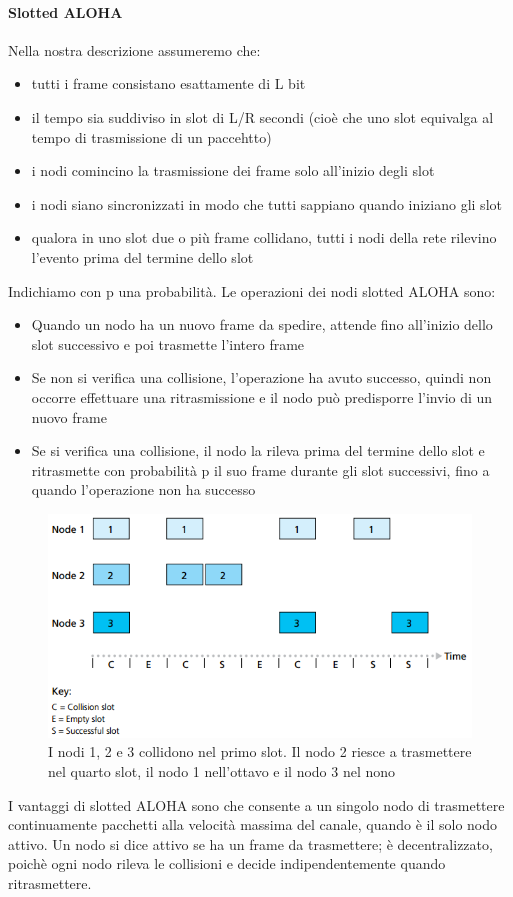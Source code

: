 \documentclass[11pt,a4paper]{article}
\begin{document}
\paragraph{Slotted ALOHA}
Nella nostra descrizione assumeremo che:
\begin{itemize}
	\item tutti i frame consistano esattamente di L bit
	\item il tempo sia suddiviso in slot di L/R secondi (cioè che uno slot equivalga al tempo di trasmissione di un paccehtto)
	\item i nodi comincino la trasmissione dei frame solo all'inizio degli slot
	\item i nodi siano sincronizzati in modo che tutti sappiano quando iniziano gli slot
	\item qualora in uno slot due o più frame collidano, tutti i nodi della rete rilevino l'evento prima del termine dello slot
\end{itemize}
Indichiamo con p una probabilità. Le operazioni dei nodi slotted ALOHA sono:
\begin{itemize}
	\item Quando un nodo ha un nuovo frame da spedire, attende fino all'inizio dello slot successivo e poi trasmette l'intero frame
	\item Se non si verifica una collisione, l'operazione ha avuto successo, quindi non occorre effettuare una ritrasmissione e il nodo può predisporre l'invio di un nuovo frame
	\item Se si verifica una collisione, il nodo la rileva prima del termine dello slot e ritrasmette con probabilità p il suo frame durante gli slot successivi, fino a quando l'operazione non ha successo
\end{itemize}
\begin{figure}
		\includegraphics[scale=0.6]{img/078.png}
		\caption{I nodi 1, 2 e 3 collidono nel primo slot. Il nodo 2 riesce a trasmettere nel quarto slot, il nodo 1 nell'ottavo e il nodo 3 nel nono}
		\label{fig: 078}
\end{figure}
I vantaggi di slotted ALOHA sono che consente a un singolo nodo di trasmettere continuamente pacchetti alla velocità massima del canale, quando è il solo nodo attivo. Un nodo si dice attivo se ha un frame da trasmettere; è decentralizzato, poichè ogni nodo rileva le collisioni e decide indipendentemente quando ritrasmettere.
\end{document}
